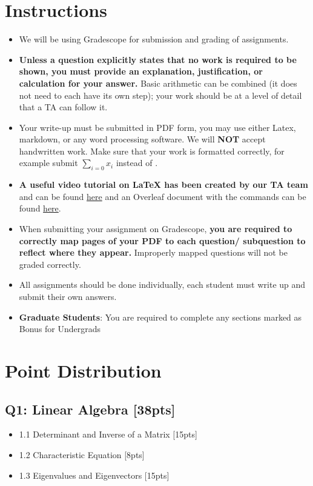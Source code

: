 \documentclass{article}
\begin{document}
\section*{Instructions}
\begin{itemize}
    \item We will be using Gradescope for submission and grading of assignments. 
    \item \textbf{Unless a question explicitly states that no work is required to be shown, you must provide an explanation, justification, or calculation for your answer.} Basic arithmetic can be combined (it does not need to each have its own step); your work should be at a level of detail that a TA can follow it.
    \item Your write-up must be submitted in PDF form, you may use either Latex,  markdown, or any word processing software. \color{red}We will \textbf{NOT} accept handwritten work. \color{black}Make sure that your work is formatted correctly, for example submit $\sum_{i=0} x_i$ instead of . 
    \item \textbf{A useful video tutorial on LaTeX has been created by our TA team} and can be found \href{https://www.dropbox.com/s/wywx114wtfoweru/Latex\%20Tutorial.mp4?dl=0}{here} and an Overleaf document with the commands can be found \href{https://www.overleaf.com/read/yjxbshkffvkm}{here}.

    \item When submitting your assignment on Gradescope, \textbf{you are required to correctly map pages of your PDF to each question/ subquestion to reflect where they appear.}  Improperly mapped questions will not be graded correctly.
    \item All assignments should be done individually, each student must write up and submit their own answers.
    \item \color{red}\textbf{Graduate Students}\color{black}: You are required to complete any sections marked as Bonus for Undergrads
\end{itemize}
\newpage

\section*{Point Distribution}
\subsection*{Q1: Linear Algebra [38pts]}
\begin{itemize}
    \item 1.1 Determinant and Inverse of a Matrix [15pts]
    \item 1.2 Characteristic Equation [8pts]
    \item 1.3 Eigenvalues and Eigenvectors [15pts]
\end{itemize}
\end{document}
